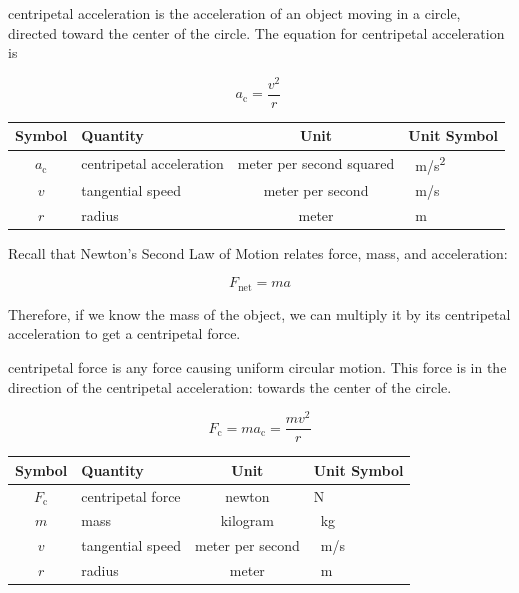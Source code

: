 \documentclass[dvipsnames]{article}
\numberwithin{equation}{section}
\numberwithin{figure}{section}
\begin{document}
\begin{mdframed}[backgroundcolor=black!10]
\Gls{centripetal acceleration} is the acceleration of an object moving in a circle, directed toward the center of the circle. The equation for centripetal acceleration is


\begin{equation} \label{5vsZ8y}
    a_{\text{c}} = \frac{v^2}{r}\ 
\end{equation}

\begin{center}
    \begin{tabular}{cl|cl}
    \hline
    \textbf{Symbol} & \textbf{Quantity} & \textbf{Unit} & \textbf{Unit Symbol}  \\
    \hline\hline
    \rule{0pt}{2.5ex}
        $a_{\text{c}}$ & centripetal acceleration & meter per second squared & \SI{}{m/s^2}\\
        $v$ & tangential speed & meter per second & \SI{}{m/s} \\
        $r$ & radius & meter & \SI{}{m}\\
    \hline
    \end{tabular}
\end{center}
\end{mdframed}

Recall that Newton's Second Law of Motion relates force, mass, and acceleration:

\begin{equation*}
    F_{\text{net}} = ma
\end{equation*}

Therefore, if we know the mass of the object, we can multiply it by its centripetal acceleration to get a centripetal force.

\begin{mdframed}[backgroundcolor=black!10]
\Gls{centripetal force} is any force causing uniform circular motion. This force is in the direction of the centripetal acceleration: towards the center of the circle.

\begin{equation} \label{qzzym8}
    F_{\text{c}} = m a_{\text{c}} = \frac{m v^2}{r}
\end{equation}

\begin{center}
    \begin{tabular}{cl|cl}
    \hline
    \textbf{Symbol} & \textbf{Quantity} & \textbf{Unit} & \textbf{Unit Symbol}  \\
    \hline\hline
    \rule{0pt}{2.5ex}
        $F_{\text{c}}$ & centripetal force & newton & N\\
        $m$ & mass & kilogram & \SI{}{kg}\\
        $v$ & tangential speed & meter per second & \SI{}{m/s} \\
        $r$ & radius & meter & \SI{}{m}\\
    \hline
    \end{tabular}
\end{center}
\end{mdframed}
\end{document}
